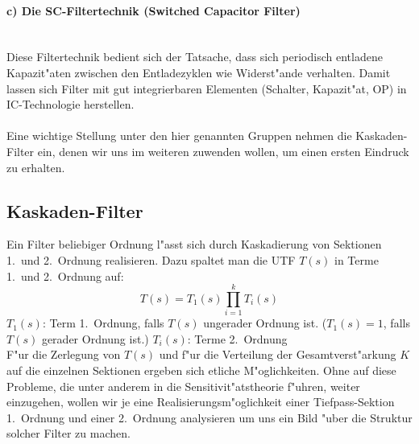\paragraph{c) Die SC-Filtertechnik (Switched Capacitor Filter)}~\\
Diese Filtertechnik bedient sich der Tatsache, dass sich periodisch
entladene Kapazit"aten zwischen den Entladezyklen wie Widerst"ande
verhalten. Damit lassen sich Filter mit gut integrierbaren Elementen
(Schalter, Kapazit"at, OP) in IC-Technologie herstellen.\\~\\  
\nit Eine wichtige Stellung unter den hier genannten Gruppen nehmen die
Kaskaden-Filter ein, denen wir uns im weiteren zuwenden wollen, um
einen ersten Eindruck zu erhalten.
\subsection{Kaskaden-Filter}
Ein Filter beliebiger Ordnung l"asst sich durch Kaskadierung von
Sektionen 1.~und 2.~Ordnung realisieren.  Dazu spaltet man die UTF
$T(s)$ in Terme 1.~und 2.~Ordnung auf:
\begin{equation}
T(s)=T_1(s) \prod_{i=1}^{k} T_i(s)
\end{equation}
$T_1(s)$:  Term 1.~Ordnung, falls $T(s)$ ungerader Ordnung ist. ($T_1(s)=1$, falls $T(s)$ gerader Ordnung ist.)
$T_i(s)$:  Terme 2.~Ordnung\\
\nit F"ur die Zerlegung von $T(s)$ und f"ur die Verteilung der 
Gesamtverst"arkung $K$
auf die einzelnen Sektionen ergeben sich etliche M"oglichkeiten. Ohne auf
diese Probleme, die unter anderem in die Sensitivit"atstheorie f"uhren, weiter
einzugehen, wollen wir je eine Realisierungsm"oglichkeit einer Tiefpass-Sektion 
1.~Ordnung und einer 2.~Ordnung analysieren um uns ein Bild "uber die Struktur
solcher Filter zu machen.
